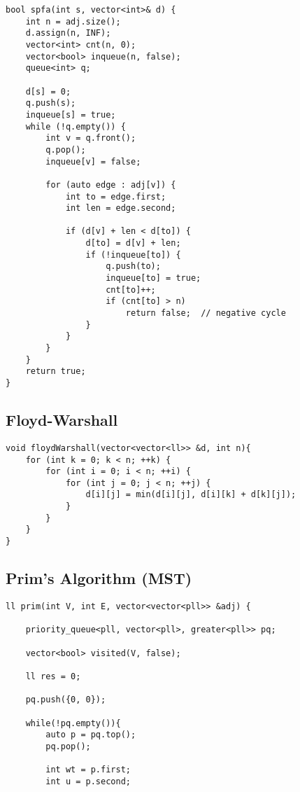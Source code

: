 \documentclass[10pt]{article}
\begin{document}
\begin{multicols*}{2}
\begin{lstlisting}[style=compactcpp]
bool spfa(int s, vector<int>& d) {
    int n = adj.size();
    d.assign(n, INF);
    vector<int> cnt(n, 0);
    vector<bool> inqueue(n, false);
    queue<int> q;

    d[s] = 0;
    q.push(s);
    inqueue[s] = true;
    while (!q.empty()) {
        int v = q.front();
        q.pop();
        inqueue[v] = false;

        for (auto edge : adj[v]) {
            int to = edge.first;
            int len = edge.second;

            if (d[v] + len < d[to]) {
                d[to] = d[v] + len;
                if (!inqueue[to]) {
                    q.push(to);
                    inqueue[to] = true;
                    cnt[to]++;
                    if (cnt[to] > n)
                        return false;  // negative cycle
                }
            }
        }
    }
    return true;
}
\end{lstlisting}


\subsection{Floyd-Warshall}

\begin{lstlisting}[style=compactcpp]
void floydWarshall(vector<vector<ll>> &d, int n){
    for (int k = 0; k < n; ++k) {
        for (int i = 0; i < n; ++i) {
            for (int j = 0; j < n; ++j) {
                d[i][j] = min(d[i][j], d[i][k] + d[k][j]); 
            }
        }
    }
}
\end{lstlisting}

\subsection{Prim's Algorithm (MST)}

\begin{lstlisting}[style=compactcpp]
ll prim(int V, int E, vector<vector<pll>> &adj) {
  
    priority_queue<pll, vector<pll>, greater<pll>> pq; 
    
    vector<bool> visited(V, false);
    
    ll res = 0;
    
    pq.push({0, 0});
    
    while(!pq.empty()){
        auto p = pq.top();
        pq.pop();
        
        int wt = p.first; 
        int u = p.second;
        

\end{lstlisting}
\end{multicols*}
\end{document}
